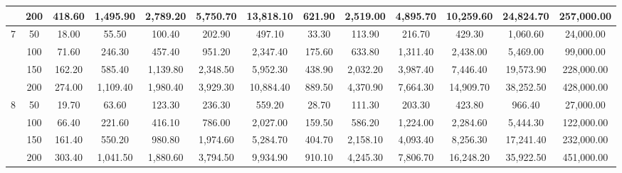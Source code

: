 \begin{table}[htbp]
\begin{adjustbox}{angle=90}
{\begin{tabular}{|c|c|c|c|c|c|c|c|c|c|c|c|c|}
     & 200 & 418.60 & 1,495.90 & 2,789.20 & 5,750.70 & 13,818.10 & 621.90 & 2,519.00 & 4,895.70 & 10,259.60 & 24,824.70                           & 257,000.00 \\ \hline
    7 & 50 & 18.00 & 55.50 & 100.40 & 202.90 & 497.10 & 33.30 & 113.90 & 216.70 & 429.30 & 1,060.60                                               & 24,000.00 \\
     & 100 & 71.60 & 246.30 & 457.40 & 951.20 & 2,347.40 & 175.60 & 633.80 & 1,311.40 & 2,438.00 & 5,469.00                                       & 99,000.00 \\
     & 150 & 162.20 & 585.40 & 1,139.80 & 2,348.50 & 5,952.30 & 438.90 & 2,032.20 & 3,987.40 & 7,446.40 & 19,573.90                               & 228,000.00 \\
     & 200 & 274.00 & 1,109.40 & 1,980.40 & 3,929.30 & 10,884.40 & 889.50 & 4,370.90 & 7,664.30 & 14,909.70 & 38,252.50                           & 428,000.00 \\ \hline
    8 & 50 & 19.70 & 63.60 & 123.30 & 236.30 & 559.20 & 28.70 & 111.30 & 203.30 & 423.80 & 966.40                                                 & 27,000.00 \\
     & 100 & 66.40 & 221.60 & 416.10 & 786.00 & 2,027.00 & 159.50 & 586.20 & 1,224.00 & 2,284.60 & 5,444.30                                       & 122,000.00 \\
     & 150 & 161.40 & 550.20 & 980.80 & 1,974.60 & 5,284.70 & 404.70 & 2,158.10 & 4,093.40 & 8,256.30 & 17,241.40                                 & 232,000.00 \\
     & 200 & 303.40 & 1,041.50 & 1,880.60 & 3,794.50 & 9,934.90 & 910.10 & 4,245.30 & 7,806.70 & 16,248.20 & 35,922.50                            & 451,000.00 \\ \hline
    \end{tabular}}
    \end{adjustbox}
    \label{exp:literature_all_times}
    \end{table}
    